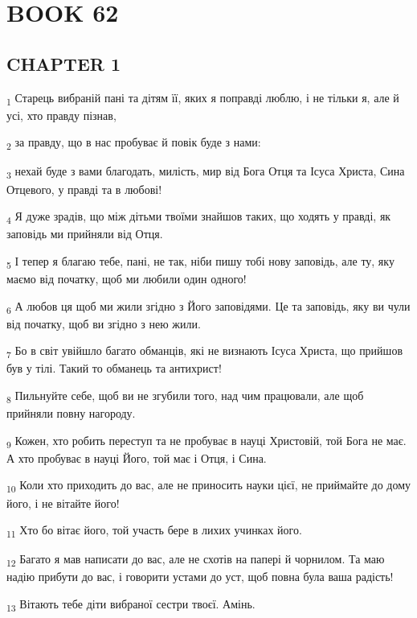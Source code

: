 \section{BOOK 62}
\subsection{CHAPTER 1}
\begin{tcolorbox}
\textsubscript{1} Старець вибраній пані та дітям її, яких я поправді люблю, і не тільки я, але й усі, хто правду пізнав,
\end{tcolorbox}
\begin{tcolorbox}
\textsubscript{2} за правду, що в нас пробуває й повік буде з нами:
\end{tcolorbox}
\begin{tcolorbox}
\textsubscript{3} нехай буде з вами благодать, милість, мир від Бога Отця та Ісуса Христа, Сина Отцевого, у правді та в любові!
\end{tcolorbox}
\begin{tcolorbox}
\textsubscript{4} Я дуже зрадів, що між дітьми твоїми знайшов таких, що ходять у правді, як заповідь ми прийняли від Отця.
\end{tcolorbox}
\begin{tcolorbox}
\textsubscript{5} І тепер я благаю тебе, пані, не так, ніби пишу тобі нову заповідь, але ту, яку маємо від початку, щоб ми любили один одного!
\end{tcolorbox}
\begin{tcolorbox}
\textsubscript{6} А любов ця щоб ми жили згідно з Його заповідями. Це та заповідь, яку ви чули від початку, щоб ви згідно з нею жили.
\end{tcolorbox}
\begin{tcolorbox}
\textsubscript{7} Бо в світ увійшло багато обманців, які не визнають Ісуса Христа, що прийшов був у тілі. Такий то обманець та антихрист!
\end{tcolorbox}
\begin{tcolorbox}
\textsubscript{8} Пильнуйте себе, щоб ви не згубили того, над чим працювали, але щоб прийняли повну нагороду.
\end{tcolorbox}
\begin{tcolorbox}
\textsubscript{9} Кожен, хто робить переступ та не пробуває в науці Христовій, той Бога не має. А хто пробуває в науці Його, той має і Отця, і Сина.
\end{tcolorbox}
\begin{tcolorbox}
\textsubscript{10} Коли хто приходить до вас, але не приносить науки цієї, не приймайте до дому його, і не вітайте його!
\end{tcolorbox}
\begin{tcolorbox}
\textsubscript{11} Хто бо вітає його, той участь бере в лихих учинках його.
\end{tcolorbox}
\begin{tcolorbox}
\textsubscript{12} Багато я мав написати до вас, але не схотів на папері й чорнилом. Та маю надію прибути до вас, і говорити устами до уст, щоб повна була ваша радість!
\end{tcolorbox}
\begin{tcolorbox}
\textsubscript{13} Вітають тебе діти вибраної сестри твоєї. Амінь.
\end{tcolorbox}
